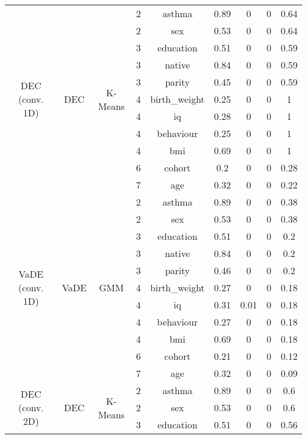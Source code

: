 \documentclass[CAT,BIB]{TFUOC}%
\begin{document}
\begin{center}
\begin{longtable}{@{}ccccccccc@{}}
            \multirow{11}{*}{DEC (conv. 1D)} & \multirow{11}{*}{DEC} & \multirow{11}{*}{K-Means} & 2 & asthma & 0.89 & 0 & 0 & 0.64 \\
            &  &  & 2 & sex & 0.53 & 0 & 0 & 0.64 \\
            &  &  & 3 & education & 0.51 & 0 & 0 & 0.59 \\
            &  &  & 3 & native & 0.84 & 0 & 0 & 0.59 \\
            &  &  & 3 & parity & 0.45 & 0 & 0 & 0.59 \\
            &  &  & 4 & birth\_weight & 0.25 & 0 & 0 & 1 \\
            &  &  & 4 & iq & 0.28 & 0 & 0 & 1 \\
            &  &  & 4 & behaviour & 0.25 & 0 & 0 & 1 \\
            &  &  & 4 & bmi & 0.69 & 0 & 0 & 1 \\
            &  &  & 6 & cohort & 0.2 & 0 & 0 & 0.28 \\
            &  &  & 7 & age & 0.32 & 0 & 0 & 0.22 \\ \midrule
            \multirow{11}{*}{VaDE (conv. 1D)} & \multirow{11}{*}{VaDE} & \multirow{11}{*}{GMM} & 2 & asthma & 0.89 & 0 & 0 & 0.38 \\
            &  &  & 2 & sex & 0.53 & 0 & 0 & 0.38 \\
            &  &  & 3 & education & 0.51 & 0 & 0 & 0.2 \\
            &  &  & 3 & native & 0.84 & 0 & 0 & 0.2 \\
            &  &  & 3 & parity & 0.46 & 0 & 0 & 0.2 \\
            &  &  & 4 & birth\_weight & 0.27 & 0 & 0 & 0.18 \\
            &  &  & 4 & iq & 0.31 & 0.01 & 0 & 0.18 \\
            &  &  & 4 & behaviour & 0.27 & 0 & 0 & 0.18 \\
            &  &  & 4 & bmi & 0.69 & 0 & 0 & 0.18 \\
            &  &  & 6 & cohort & 0.21 & 0 & 0 & 0.12 \\
            &  &  & 7 & age & 0.32 & 0 & 0 & 0.09 \\ \midrule
            \multirow{11}{*}{DEC (conv. 2D)} & \multirow{11}{*}{DEC} & \multirow{11}{*}{K-Means} & 2 & asthma & 0.89 & 0 & 0 & 0.6 \\
            &  &  & 2 & sex & 0.53 & 0 & 0 & 0.6 \\
            &  &  & 3 & education & 0.51 & 0 & 0 & 0.56 \\

\end{longtable}
\end{center}
\end{document}
